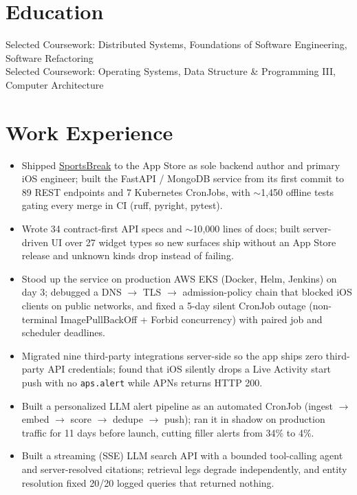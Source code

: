 \documentclass[11pt, letterpaper]{article}
\begin{document}

\section{Education}
Selected Coursework: Distributed Systems, Foundations of Software Engineering, Software Refactoring\\[1pt]
Selected Coursework: Operating Systems, Data Structure \& Programming III, Computer Architecture

\section{Work Experience}
\begin{itemize}
  \item Shipped \href{https://apps.apple.com/app/id6762649287}{SportsBreak} to the App Store as sole backend author and primary iOS engineer; built the FastAPI / MongoDB service from its first commit to 89 REST endpoints and 7 Kubernetes CronJobs, with $\sim$1{,}450 offline tests gating every merge in CI (ruff, pyright, pytest).
  \item Wrote 34 contract-first API specs and $\sim$10{,}000 lines of docs; built server-driven UI over 27 widget types so new surfaces ship without an App Store release and unknown kinds drop instead of failing.
  \item Stood up the service on production AWS EKS (Docker, Helm, Jenkins) on day 3; debugged a DNS $\to$ TLS $\to$ admission-policy chain that blocked iOS clients on public networks, and fixed a 5-day silent CronJob outage (non-terminal ImagePullBackOff + Forbid concurrency) with paired job and scheduler deadlines.
  \item Migrated nine third-party integrations server-side so the app ships zero third-party API credentials; found that iOS silently drops a Live Activity start push with no \texttt{aps.alert} while APNs returns HTTP 200.
  \item Built a personalized LLM alert pipeline as an automated CronJob (ingest $\to$ embed $\to$ score $\to$ dedupe $\to$ push); ran it in shadow on production traffic for 11 days before launch, cutting filler alerts from 34\% to 4\%.
  \item Built a streaming (SSE) LLM search API with a bounded tool-calling agent and server-resolved citations; retrieval legs degrade independently, and entity resolution fixed 20/20 logged queries that returned nothing.
\end{itemize}
\end{document}
